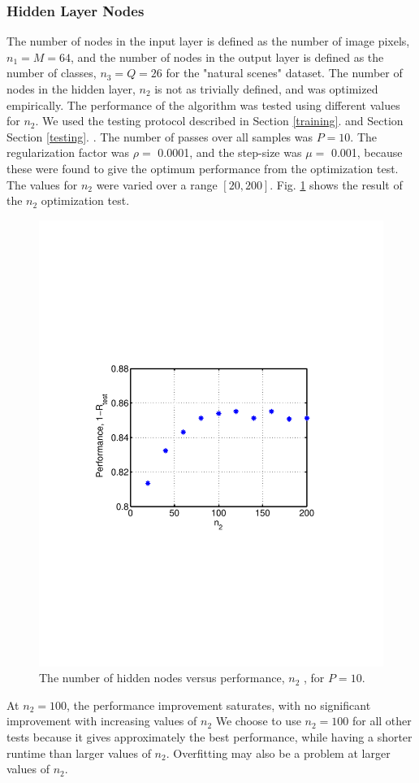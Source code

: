 \documentclass[journal,a4paper,onecolumn,11pt]{IEEEtran}
\begin{document}
\subsubsection{Hidden Layer Nodes}
The number of nodes in the input layer is defined as the number of image pixels, $n_1=M=64$, and the number of nodes in the output layer is defined as the number of classes, $n_3=Q=26$ for the "natural scenes" dataset. The number of nodes in the hidden layer, $n_2$ is not as trivially defined, and was optimized empirically. The performance of the algorithm was tested using different values for $n_2$. We used the testing protocol described in Section \ref{training}.  and Section Section \ref{testing}. . The number of passes over all samples was $P=10$. The regularization factor was $\rho=$ \num{0.0001}, and the step-size was $\mu=$ \num{.001}, because these were found to give the optimum performance from the optimization test. The values for $n_2$ were varied over a range $[20,200]$. Fig. \ref{fig:n2_opt_fnt_sm_10run} shows the result of the $n_2$ optimization test.

\begin{figure}[!h]
	\centering
	\includegraphics[clip, trim=3.5cm 8.5cm 3.5cm 8.5cm, width=.5\textwidth]{n2_opt_fnt_sm_10run.pdf}
	\caption{The number of hidden nodes versus performance, $n_2$ , for $P=10$.}
	\label{fig:n2_opt_fnt_sm_10run}
\end{figure}

At $n_2=100$, the performance improvement saturates, with no significant improvement with increasing values of $n_2$ We choose to use $n_2=100$ for all other tests because it gives approximately the best performance, while having a shorter runtime than larger values of $n_2$. Overfitting may also be a problem at larger values of $n_2$.
\end{document}

